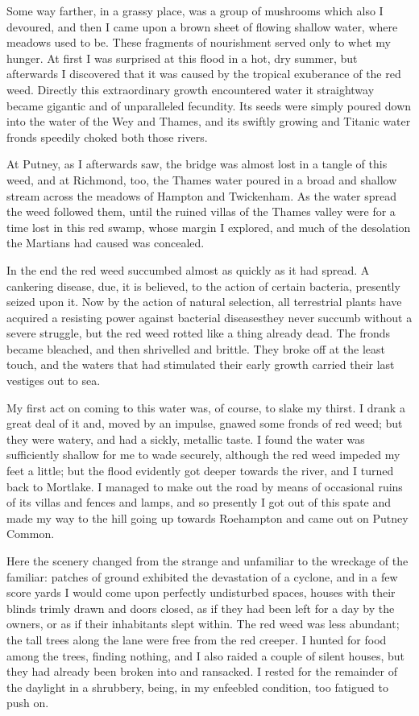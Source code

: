 Some way farther, in a grassy place, was a group of mushrooms which
also I devoured, and then I came upon a brown sheet of flowing
shallow water, where meadows used to be. These fragments of
nourishment served only to whet my hunger. At first I was surprised
at this flood in a hot, dry summer, but afterwards I discovered
that it was caused by the tropical exuberance of the red weed.
Directly this extraordinary growth encountered water it straightway
became gigantic and of unparalleled fecundity. Its seeds were
simply poured down into the water of the Wey and Thames, and its
swiftly growing and Titanic water fronds speedily choked both those
rivers.

At Putney, as I afterwards saw, the bridge was almost lost in a
tangle of this weed, and at Richmond, too, the Thames water poured
in a broad and shallow stream across the meadows of Hampton and
Twickenham. As the water spread the weed followed them, until the
ruined villas of the Thames valley were for a time lost in this red
swamp, whose margin I explored, and much of the desolation the
Martians had caused was concealed.

In the end the red weed succumbed almost as quickly as it had
spread. A cankering disease, due, it is believed, to the action of
certain bacteria, presently seized upon it. Now by the action of
natural selection, all terrestrial plants have acquired a resisting
power against bacterial diseases\dash{}they never succumb without a
severe struggle, but the red weed rotted like a thing already dead.
The fronds became bleached, and then shrivelled and brittle. They
broke off at the least touch, and the waters that had stimulated
their early growth carried their last vestiges out to sea.

My first act on coming to this water was, of course, to slake my
thirst. I drank a great deal of it and, moved by an impulse, gnawed
some fronds of red weed; but they were watery, and had a sickly,
metallic taste. I found the water was sufficiently shallow for me
to wade securely, although the red weed impeded my feet a little;
but the flood evidently got deeper towards the river, and I turned
back to Mortlake. I managed to make out the road by means of
occasional ruins of its villas and fences and lamps, and so
presently I got out of this spate and made my way to the hill going
up towards Roehampton and came out on Putney Common.

Here the scenery changed from the strange and unfamiliar to the
wreckage of the familiar: patches of ground exhibited the
devastation of a cyclone, and in a few score yards I would come
upon perfectly undisturbed spaces, houses with their blinds trimly
drawn and doors closed, as if they had been left for a day by the
owners, or as if their inhabitants slept within. The red weed was
less abundant; the tall trees along the lane were free from the red
creeper. I hunted for food among the trees, finding nothing, and I
also raided a couple of silent houses, but they had already been
broken into and ransacked. I rested for the remainder of the
daylight in a shrubbery, being, in my enfeebled condition, too
fatigued to push on.

